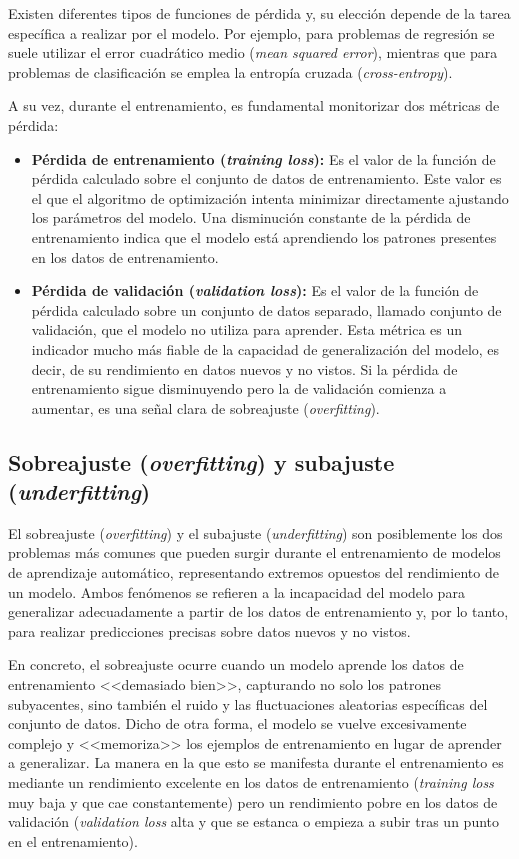 Existen diferentes tipos de funciones de pérdida y, su elección depende de la tarea específica a realizar por el modelo. Por ejemplo, para problemas de regresión se suele utilizar el error cuadrático medio (\textit{mean squared error}), mientras que para problemas de clasificación se emplea la entropía cruzada (\textit{cross-entropy}).

A su vez, durante el entrenamiento, es fundamental monitorizar dos métricas de pérdida:

\begin{itemize}
	\item \textbf{Pérdida de entrenamiento (\textit{training loss}):} Es el valor de la función de pérdida calculado sobre el conjunto de datos de entrenamiento. Este valor es el que el algoritmo de optimización intenta minimizar directamente ajustando los parámetros del modelo. Una disminución constante de la pérdida de entrenamiento indica que el modelo está aprendiendo los patrones presentes en los datos de entrenamiento.
	
	\item \textbf{Pérdida de validación (\textit{validation loss}):} Es el valor de la función de pérdida calculado sobre un conjunto de datos separado, llamado conjunto de validación, que el modelo no utiliza para aprender. Esta métrica es un indicador mucho más fiable de la capacidad de generalización del modelo, es decir, de su rendimiento en datos nuevos y no vistos. Si la pérdida de entrenamiento sigue disminuyendo pero la de validación comienza a aumentar, es una señal clara de sobreajuste (\textit{overfitting}).
\end{itemize}

\subsection{Sobreajuste (\textit{overfitting}) y subajuste (\textit{underfitting})}

El sobreajuste (\textit{overfitting}) y el subajuste (\textit{underfitting}) son posiblemente los dos problemas más comunes que pueden surgir durante el entrenamiento de modelos de aprendizaje automático, representando extremos opuestos del rendimiento de un modelo. Ambos fenómenos se refieren a la incapacidad del modelo para generalizar adecuadamente a partir de los datos de entrenamiento y, por lo tanto, para realizar predicciones precisas sobre datos nuevos y no vistos.

En concreto, el sobreajuste ocurre cuando un modelo aprende los datos de entrenamiento <<demasiado bien>>, capturando no solo los patrones subyacentes, sino también el ruido y las fluctuaciones aleatorias específicas del conjunto de datos. Dicho de otra forma, el modelo se vuelve excesivamente complejo y <<memoriza>> los ejemplos de entrenamiento en lugar de aprender a generalizar. La manera en la que esto se manifesta durante el entrenamiento es mediante un rendimiento excelente en los datos de entrenamiento (\textit{training loss} muy baja y que cae constantemente) pero un rendimiento pobre en los datos de validación (\textit{validation loss} alta y que se estanca o empieza a subir tras un punto en el entrenamiento).

